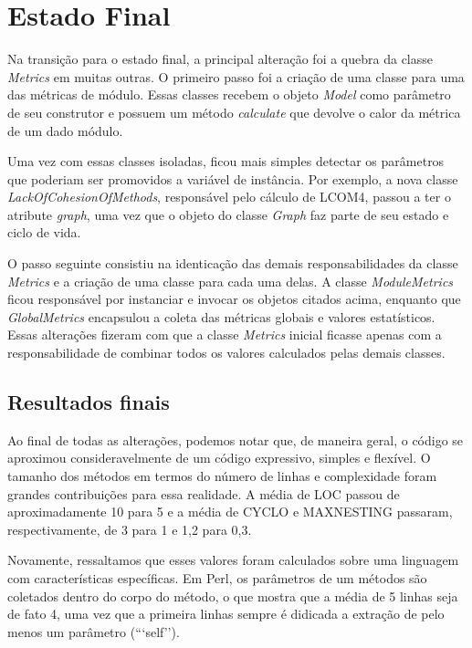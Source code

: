 \section{Estado Final}

Na transição para o estado final, a principal alteração foi a quebra da classe \textit{Metrics}
em muitas outras. O primeiro passo foi a criação de uma classe para uma das métricas de módulo.
Essas classes recebem o objeto \textit{Model} como parâmetro de seu construtor e possuem
um método \textit{calculate} que devolve o calor da métrica de um dado módulo.

Uma vez com essas classes isoladas, ficou mais simples detectar os parâmetros que poderiam
ser promovidos a variável de instância. Por exemplo, a nova classe \textit{LackOfCohesionOfMethods}, 
responsável pelo cálculo de LCOM4, passou a ter o atribute \textit{graph}, uma vez que 
o objeto do classe \textit{Graph} faz parte de seu estado e ciclo de vida.

O passo seguinte consistiu na identicação das demais responsabilidades da classe \textit{Metrics} 
e a criação de uma classe para cada uma delas. A classe \textit{ModuleMetrics} ficou responsável
por instanciar e invocar os objetos citados acima, enquanto que \textit{GlobalMetrics} encapsulou
a coleta das métricas globais e valores estatísticos. Essas alterações fizeram com que a classe
\textit{Metrics} inicial ficasse apenas com a responsabilidade de combinar todos os valores
calculados pelas demais classes.

\subsection{Resultados finais}
Ao final de todas as alterações, podemos notar que, de maneira geral, o código se aproximou
consideravelmente de um código expressivo, simples e flexível. O tamanho dos métodos em termos
do número de linhas e complexidade foram grandes contribuições para essa realidade. A média de
LOC passou de aproximadamente 10 para 5 e a média de CYCLO e MAXNESTING passaram, respectivamente,
de 3 para 1 e 1,2 para 0,3.

Novamente, ressaltamos que esses valores foram calculados sobre uma linguagem com
características específicas. Em Perl, os parâmetros de um métodos são coletados dentro
do corpo do método, o que mostra que a média de 5 linhas seja de fato 4, uma vez que a
primeira linhas sempre é didicada a extração de pelo menos um parâmetro (```self'').

